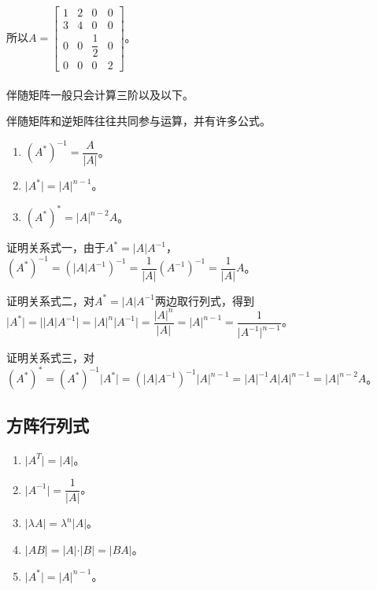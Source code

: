 所以$A=\left[\begin{array}{cccc}
    1 & 2 & 0 & 0 \\
    3 & 4 & 0 & 0 \\
    0 & 0 & \dfrac{1}{2} & 0 \\
    0 & 0 & 0 & 2
\end{array}\right]$。

\paragraph{}

伴随矩阵一般只会计算三阶以及以下。

伴随矩阵和逆矩阵往往共同参与运算，并有许多公式。

\begin{enumerate}
    \item $(A^*)^{-1}=\dfrac{A}{\vert A\vert}$。
    \item $\vert A^*\vert=\vert A\vert^{n-1}$。
    \item $(A^*)^*=\vert A\vert^{n-2}A$。
\end{enumerate}

证明关系式一，由于$A^*=\vert A\vert A^{-1}$，$(A^*)^{-1}=(\vert A\vert A^{-1})^{-1}=\dfrac{1}{\vert A\vert}(A^{-1})^{-1}=\dfrac{1}{\vert A\vert}A$。

证明关系式二，对$A^*=\vert A\vert A^{-1}$两边取行列式，得到$\vert A^*\vert=\vert\vert A\vert A^{-1}\vert=\vert A\vert^n\vert A^{-1}\vert=\dfrac{\vert A\vert^n}{\vert A\vert}=\vert A\vert^{n-1}=\dfrac{1}{\vert A^{-1}\vert^{n-1}}$。

证明关系式三，对$(A^*)^*=(A^*)^{-1}\vert A^*\vert=(\vert A\vert A^{-1})^{-1}\vert A\vert^{n-1}=\vert A\vert^{-1}A\vert A\vert^{n-1}=\vert A\vert^{n-2}A$。

\subsection{方阵行列式}

\paragraph{}

\begin{enumerate}
    \item $\vert A^T\vert=\vert A\vert$。
    \item $\vert A^{-1}\vert=\dfrac{1}{\vert A\vert}$。
    \item $\vert\lambda A\vert=\lambda^n\vert A\vert$。
    \item $\vert AB\vert=\vert A\vert\cdot\vert B\vert=\vert BA\vert$。
    \item $\vert A^*\vert=\vert A\vert^{n-1}$。
\end{enumerate}

